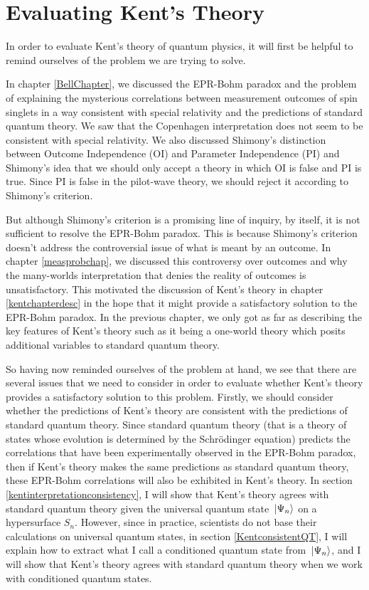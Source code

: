 \chapter{Evaluating Kent's Theory\label{KentEval}}
In order to evaluate Kent's theory of quantum physics, it will first be helpful to remind ourselves of the problem we are trying to solve. 

In chapter \ref{BellChapter}, we discussed the EPR-Bohm paradox and the problem of explaining  the mysterious correlations between measurement outcomes of spin singlets in a way consistent with special relativity and the predictions of standard quantum theory. We saw that the Copenhagen interpretation does not seem to be consistent with special relativity. We also discussed Shimony's distinction between Outcome Independence (OI) and Parameter Independence (PI) and Shimony's idea that we should only accept a theory in which OI is false and PI is true. Since PI is false in the pilot-wave theory, we should reject it according to Shimony's criterion. 

But although Shimony's criterion is a promising line of inquiry, by itself, it is not sufficient to resolve the  EPR-Bohm paradox. This is because Shimony's criterion doesn't address the controversial issue of what is meant by an outcome. In chapter \ref{measprobchap}, we discussed this controversy over outcomes and why the many-worlds interpretation that denies the reality of outcomes is unsatisfactory. This motivated the discussion of Kent's theory in chapter \ref{kentchapterdesc} in the hope that it might provide a satisfactory solution to the EPR-Bohm paradox. In the previous chapter, we only got as far as describing the key features of Kent's theory such as it being a one-world theory which posits additional variables to standard quantum theory. 

So having now reminded ourselves of the problem at hand, we see that there are several issues that we need to consider in order to evaluate whether Kent's theory provides a satisfactory solution to this problem. Firstly, we should consider whether the predictions of Kent's theory are consistent with the  predictions of standard quantum theory. Since standard quantum theory (that is a theory of states whose evolution is determined by the Schr\"{o}dinger equation) predicts the correlations that have been experimentally observed in the EPR-Bohm paradox, then if Kent's theory makes the same predictions as standard quantum theory, these EPR-Bohm correlations will also be exhibited in Kent's theory.  In section \ref{kentinterpretationconsistency}, I will show that Kent's theory agrees with standard quantum theory given the universal quantum state $\ket*{\Psi_n}$ on a hypersurface $S_n$. However, since in practice, scientists do not base their calculations on universal quantum states, in section \ref{KentconsistentQT}, I will explain how to extract what I call a conditioned quantum state from $\ket*{\Psi_n}$, and I will show that  Kent's theory agrees with standard quantum theory when we work with conditioned quantum states.

